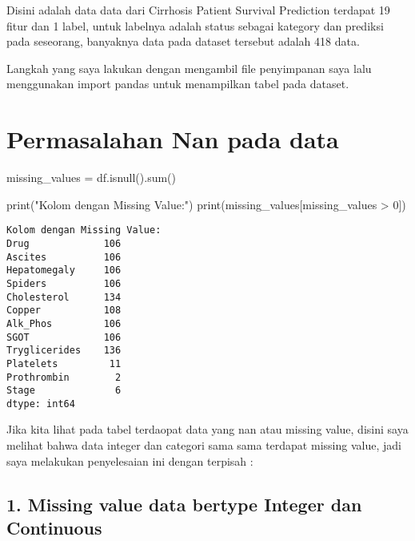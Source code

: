 \documentclass[
  letterpaper,
]{krantz}
\makeatletter
\newenvironment{Shaded}{\begin{snugshade}}{\end{snugshade}}
\newcommand{\BuiltInTok}[1]{\textcolor[rgb]{0.00,0.23,0.31}{#1}}
\newcommand{\DecValTok}[1]{\textcolor[rgb]{0.68,0.00,0.00}{#1}}
\newcommand{\NormalTok}[1]{\textcolor[rgb]{0.00,0.23,0.31}{#1}}
\newcommand{\OperatorTok}[1]{\textcolor[rgb]{0.37,0.37,0.37}{#1}}
\newcommand{\StringTok}[1]{\textcolor[rgb]{0.13,0.47,0.30}{#1}}
\newenvironment{kframe}{%
\medskip{}
\setlength{\fboxsep}{.8em}
 \def\at@end@of@kframe{}%
 \ifinner\ifhmode%
  \def\at@end@of@kframe{\end{minipage}}%
  \begin{minipage}{\columnwidth}%
 \fi\fi%
 \def\FrameCommand##1{\hskip\@totalleftmargin \hskip-\fboxsep
 \colorbox{shadecolor}{##1}\hskip-\fboxsep
     \hskip-\linewidth \hskip-\@totalleftmargin \hskip\columnwidth}%
 \MakeFramed {\advance\hsize-\width
   \@totalleftmargin\z@ \linewidth\hsize
   \@setminipage}}%
 {\par\unskip\endMakeFramed%
 \at@end@of@kframe}
\renewenvironment{Shaded}{\begin{kframe}}{\end{kframe}}
\makeatother
\begin{document}
Disini adalah data data dari Cirrhosis Patient Survival Prediction
terdapat 19 fitur dan 1 label, untuk labelnya adalah status sebagai
kategory dan prediksi pada seseorang, banyaknya data pada dataset
tersebut adalah 418 data.

Langkah yang saya lakukan dengan mengambil file penyimpanan saya lalu
menggunakan import pandas untuk menampilkan tabel pada dataset.

\hypertarget{permasalahan-nan-pada-data}{%
\section*{Permasalahan Nan pada data}\label{permasalahan-nan-pada-data}}


\begin{Shaded}
\begin{Highlighting}[]
\NormalTok{missing\_values }\OperatorTok{=}\NormalTok{ df.isnull().}\BuiltInTok{sum}\NormalTok{()}


\BuiltInTok{print}\NormalTok{(}\StringTok{"Kolom dengan Missing Value:"}\NormalTok{)}
\BuiltInTok{print}\NormalTok{(missing\_values[missing\_values }\OperatorTok{\textgreater{}} \DecValTok{0}\NormalTok{])}
\end{Highlighting}
\end{Shaded}

\begin{verbatim}
Kolom dengan Missing Value:
Drug             106
Ascites          106
Hepatomegaly     106
Spiders          106
Cholesterol      134
Copper           108
Alk_Phos         106
SGOT             106
Tryglicerides    136
Platelets         11
Prothrombin        2
Stage              6
dtype: int64
\end{verbatim}

Jika kita lihat pada tabel terdaopat data yang nan atau missing value,
disini saya melihat bahwa data integer dan categori sama sama terdapat
missing value, jadi saya melakukan penyelesaian ini dengan terpisah :

\hypertarget{missing-value-data-bertype-integer-dan-continuous}{%
\subsection*{1. Missing value data bertype Integer dan
Continuous}\label{missing-value-data-bertype-integer-dan-continuous}}
\end{document}
